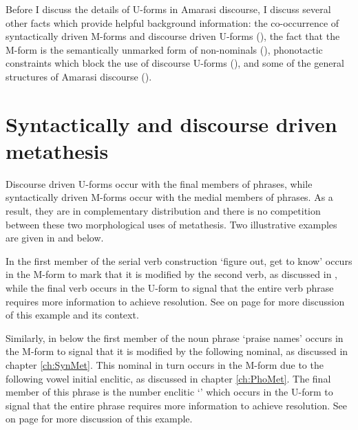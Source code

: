 Before I discuss the details of U-forms in Amarasi discourse,
I discuss several other facts which provide helpful background information:
the co-occurrence of syntactically driven M-forms
and discourse driven U-forms (),
the fact that the M-form is the semantically
unmarked form of non-nominals (),
phonotactic constraints which block the use
of discourse U-forms (),
and some of the general structures of Amarasi discourse ().

\section{Syntactically and discourse driven metathesis}\label{sec:SynDisDriMet}
Discourse driven U-forms occur with
the final members of phrases, while syntactically driven
M-forms occur with the medial members of phrases.
As a result, they are in complementary distribution and 
there is no competition between these two morphological uses of metathesis.
Two illustrative examples are given in 
and  below.

In  the first member of the serial verb
construction  `figure out, get to know'
occurs in the M-form to mark that
it is modified by the second verb, as discussed in ,
while the final verb occurs in the U-form
to signal that the entire verb phrase requires more information to achieve resolution.
See  on page \pageref{ex:160326, 5.37-5.45}
for more discussion of this example and its context.

\begin{exe}
	\label{ex2:160326, 5.37}
\end{exe}

Similarly, in  below the first member
of the noun phrase  `praise names' occurs in the M-form to signal
that it is modified by the following nominal,
as discussed in chapter \ref{ch:SynMet}.
This nominal in turn occurs in the M-form due to the following
vowel initial enclitic, as discussed in chapter \ref{ch:PhoMet}.
The final member of this phrase is the number enclitic  `{\ein}'
which occurs in the U-form to signal that the entire phrase requires
more information to achieve resolution.
See  on page \pageref{ex:160326, 18.26}
for more discussion of this example.

